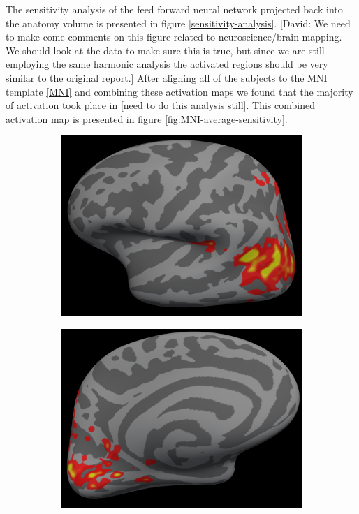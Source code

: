 \documentclass[preprint,authoryear,12pt]{elsarticle}
\begin{document}
The sensitivity analysis of the feed forward neural network projected back into the anatomy volume is presented in figure \ref{sensitivity-analysis}.
[David: We need to make come comments on this figure related to neuroscience/brain mapping. We should look at the data to make sure this is true, but since we are still employing the same harmonic analysis the activated regions should be very similar to the original report.]
After aligning all of the subjects to the MNI template \ref{MNI} and combining these activation maps we found that the majority of activation took place in [need to do this analysis still].
This combined activation map is presented in figure \ref{fig:MNI-average-sensitivity}.

\begin{figure}
\centering
\begin{subfigure}{0.4\textwidth}
\centering
\includegraphics[width=\textwidth]{figures/lh-lateral-smax-average}
\caption{}
\label{fig:lh-lateral-smax-average}
\end{subfigure}
\begin{subfigure}{0.4\textwidth}
\centering
\includegraphics[width=\textwidth]{figures/lh-medial-smax-average}

\end{subfigure}
\end{figure}
\end{document}
